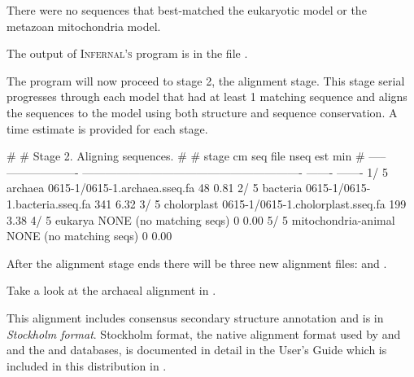 There were no sequences that
best-matched the eukaryotic model or the metazoan mitochondria model.

The output of
\textsc{Infernal's}  program is in the file
.

The program will now proceed to stage 2, the alignment stage. This
stage serial progresses through each model that had at least 1
matching sequence and aligns the sequences to the model using both
structure and sequence conservation. A time estimate is provided for
each stage.

\begin{sreoutput}
#
# Stage 2. Aligning sequences.
#
# stage  cm                   seq file                                                         nseq  est min
# -----  -------------------  ----------------------------------------------------------    -------  -------
   1/ 5  archaea              0615-1/0615-1.archaea.sseq.fa                                      48     0.81
   2/ 5  bacteria             0615-1/0615-1.bacteria.sseq.fa                                    341     6.32
   3/ 5  cholorplast          0615-1/0615-1.cholorplast.sseq.fa                                 199     3.38
   4/ 5  eukarya              NONE (no matching seqs)                                             0     0.00
   5/ 5  mitochondria-animal  NONE (no matching seqs)                                             0     0.00
\end{sreoutput}

After the alignment stage ends there will be three new alignment files:
 and . 

Take a look at the archaeal alignment in
. 

This alignment includes consensus secondary structure annotation and
is in \emph{Stockholm format}. 
Stockholm format, the native alignment format used by  and
 and the  and 
databases, is documented in detail in the  User's
Guide which is included in this distribution in
.

